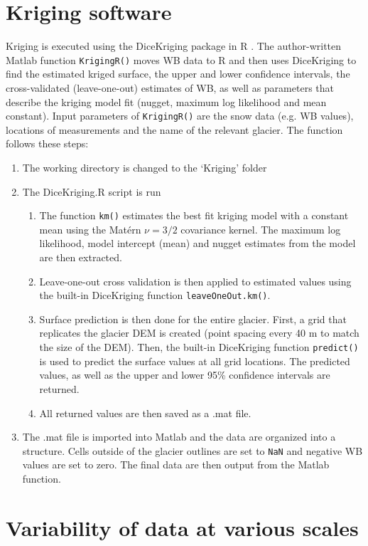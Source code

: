 \documentclass{sfuthesis}
\begin{document}
\begin{appendices}
\chapter{Kriging software}
\label{app:KrigingMethods}
Kriging is executed using the DiceKriging package in R \citep{Roustant2012}. The author-written Matlab function \texttt{KrigingR()} moves WB data to R and then uses DiceKriging to find the estimated kriged surface, the upper and lower confidence intervals, the cross-validated (leave-one-out) estimates of WB, as well as parameters that describe the kriging model fit (nugget, maximum log likelihood and mean constant). Input parameters of  \texttt{KrigingR()} are the snow data (e.g. WB values), locations of measurements and the name of the relevant glacier. The function follows these steps:
\begin{enumerate}
\item The working directory is changed to the `Kriging' folder
\item The DiceKriging.R script is run
	\begin{enumerate}
	\item The function \texttt{km()} estimates the best fit kriging model with a constant mean using the Mat\'ern $\nu = 3/2$ covariance kernel. The maximum log likelihood, model intercept (mean) and nugget estimates from the model are then extracted. 
	\item Leave-one-out cross validation is then applied to estimated values using the built-in DiceKriging function \texttt{leaveOneOut.km()}.
	\item Surface prediction is then done for the entire glacier. First, a grid that replicates the glacier DEM is created (point spacing every 40 m to match the size of the DEM). Then, the built-in DiceKriging function \texttt{predict()} is used to predict the surface values at all grid locations. The predicted values, as well as the upper and lower 95\% confidence intervals are returned. 
	\item All returned values are then saved as a .mat file.
	\end{enumerate}
\item The .mat file is imported into Matlab and the data are organized into a structure. Cells outside of the glacier outlines are set to \texttt{NaN} and negative WB values are set to zero. The final data are then output from the Matlab function. 
\end{enumerate}

\chapter{Variability of data at various scales}
\label{app:variability_data_multiple_scales}


\end{appendices}
\end{document}
